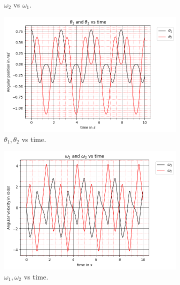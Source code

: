 \begin{figure}[H]
\begin{subfigure}[b]{0.49\textwidth}
        \caption{$\omega_2$ vs $\omega_1$.}
        \label{fig:2b}
    \end{subfigure}
    \hfill
    \begin{subfigure}[b]{0.49\textwidth}
        \centering
        \includegraphics[width=\textwidth]{figures/initial-conditions-a/Angular Positions vs Time.png}
        \caption{$\theta_1, \theta_2$ vs time.}
        \label{fig:2c}
    \end{subfigure}
    \hfill
    \begin{subfigure}[b]{0.49\textwidth}
        \centering
        \includegraphics[width=\textwidth]{figures/initial-conditions-a/Angular Velocities vs Time.png}
        \caption{$\omega_1, \omega_2$ vs time.}
        \label{fig:2d}
    \end{subfigure}
    \hfill
    \begin{subfigure}[b]{0.49\textwidth}

\end{subfigure}
\end{figure}
